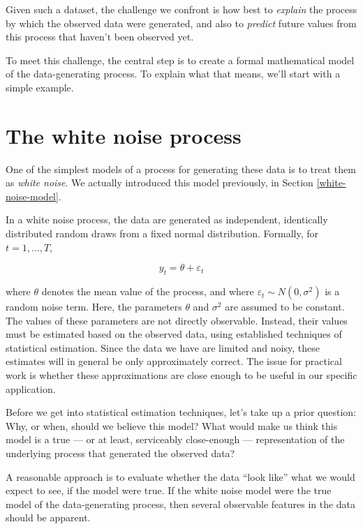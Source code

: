 \documentclass[
]{book}
\begin{document}
Given such a dataset, the challenge we confront is how best to \emph{explain} the process by which the observed data were generated, and also to \emph{predict} future values from this process that haven't been observed yet.

To meet this challenge, the central step is to create a formal mathematical model of the data-generating process. To explain what that means, we'll start with a simple example.

\hypertarget{the-white-noise-process}{%
\section{The white noise process}\label{the-white-noise-process}}

One of the simplest models of a process for generating these data is to treat them as \emph{white noise}. We actually introduced this model previously, in Section \ref{white-noise-model}.

In a white noise process, the data are generated as independent, identically distributed random draws from a fixed normal distribution. Formally, for \(t = 1, \ldots, T\),

\[
y_t = \theta + \varepsilon_t
\]

where \(\theta\) denotes the mean value of the process, and where \(\varepsilon_t \sim N(0, \sigma^2)\) is a random noise term. Here, the parameters \(\theta\) and \(\sigma^2\) are assumed to be constant. The values of these parameters are not directly observable. Instead, their values must be estimated based on the observed data, using established techniques of statistical estimation. Since the data we have are limited and noisy, these estimates will in general be only approximately correct. The issue for practical work is whether these approximations are close enough to be useful in our specific application.

Before we get into statistical estimation techniques, let's take up a prior question: Why, or when, should we believe this model? What would make us think this model is a true --- or at least, serviceably close-enough --- representation of the underlying process that generated the observed data?

A reasonable approach is to evaluate whether the data ``look like'' what we would expect to see, if the model were true. If the white noise model were the true model of the data-generating process, then several observable features in the data should be apparent.
\end{document}
